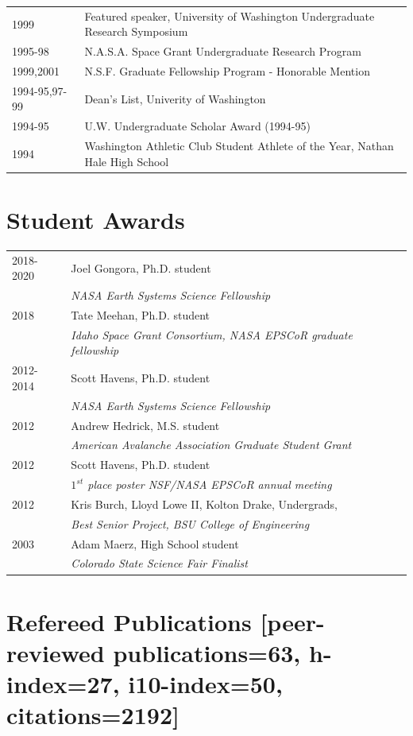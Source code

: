 \documentclass[11pt]{article}
\begin{document}
\begin{tabular}{ll}
1999 & Featured speaker, University of Washington Undergraduate Research Symposium \\
1995-98 & N.A.S.A. Space Grant Undergraduate Research Program \\
1999,2001 & N.S.F. Graduate Fellowship Program - Honorable Mention \\
1994-95,97-99 & Dean's List, Univerity of Washington \\
1994-95 & U.W. Undergraduate Scholar Award (1994-95) \\
1994 & Washington Athletic Club Student Athlete of the Year, Nathan Hale High School \\
\end{tabular}

\section*{Student Awards}
\begin{tabular}{ll}
2018-2020 & Joel Gongora, Ph.D. student \\
& \textit{NASA Earth Systems Science Fellowship} \\
2018 & Tate Meehan, Ph.D. student \\
& \textit{Idaho Space Grant Consortium, NASA EPSCoR graduate fellowship} \\
2012-2014 & Scott Havens, Ph.D. student \\
& \textit{NASA Earth Systems Science Fellowship} \\
2012 & Andrew Hedrick, M.S. student \\
& \textit{American Avalanche Association Graduate Student Grant} \\
2012 & Scott Havens, Ph.D. student \\
& \textit{$1^{st}$ place poster NSF/NASA EPSCoR annual meeting} \\
2012 & Kris Burch, Lloyd Lowe II, Kolton Drake, Undergrads, \\ 
& \textit{Best Senior Project, BSU College of Engineering} \\
2003 & Adam Maerz, High School student \\
& \textit{Colorado State Science Fair Finalist}
\end{tabular}

\pagebreak

\section*{Refereed Publications \small{[peer-reviewed publications=63, h-index=27, i10-index=50, citations=2192]}}
\setlength{\extrarowheight}{10pt}
\end{document}
